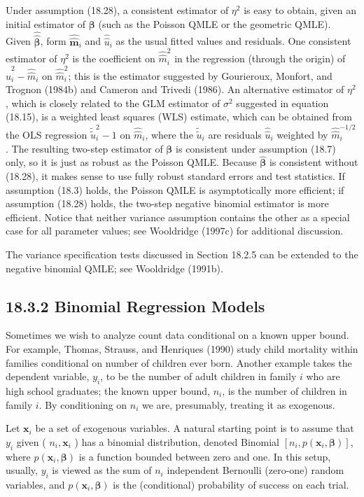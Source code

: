 \documentclass[10pt]{article}
\begin{document}
Under assumption (18.28), a consistent estimator of $\eta^{2}$ is easy to obtain, given an initial estimator of $\boldsymbol{\beta}$ (such as the Poisson QMLE or the geometric QMLE). Given $\hat{\hat{\boldsymbol{\beta}}}$, form $\hat{\hat{\boldsymbol{m}}}_{i}$ and $\hat{\hat{u}}_{i}$ as the usual fitted values and residuals. One consistent estimator of $\eta^{2}$ is the coefficient on $\hat{\hat{m}}_{i}^{2}$ in the regression (through the origin) of $\hat{\hat{u}}_{i}^{2}-\hat{\hat{m}}_{i}$ on $\hat{\hat{m}}_{i}^{2}$; this is the estimator suggested by Gourieroux, Monfort, and Trognon (1984b) and Cameron and Trivedi (1986). An alternative estimator of $\eta^{2}$, which is closely related to the GLM estimator of $\sigma^{2}$ suggested in equation (18.15), is a weighted least squares (WLS) estimate, which can be obtained from the OLS regression $\tilde{\tilde{u}}_{i}^{2}-1$ on $\hat{\hat{m}}_{i}$, where the $\tilde{\tilde{u}}_{i}$ are residuals $\hat{\hat{u}}_{i}$ weighted by $\hat{\hat{m}}_{i}^{-1 / 2}$. The resulting two-step estimator of $\boldsymbol{\beta}$ is consistent under assumption (18.7) only, so it is just as robust as the Poisson QMLE. Because $\hat{\boldsymbol{\beta}}$ is consistent without (18.28), it makes sense to use fully robust standard errors and test statistics. If assumption (18.3) holds, the Poisson QMLE is asymptotically more efficient; if assumption (18.28) holds, the two-step negative binomial estimator is more efficient. Notice that neither variance assumption contains the other as a special case for all parameter values; see Wooldridge (1997c) for additional discussion.

The variance specification tests discussed in Section 18.2.5 can be extended to the negative binomial QMLE; see Wooldridge (1991b).

\subsection*{18.3.2 Binomial Regression Models}
Sometimes we wish to analyze count data conditional on a known upper bound. For example, Thomas, Strauss, and Henriques (1990) study child mortality within families conditional on number of children ever born. Another example takes the dependent variable, $y_{i}$, to be the number of adult children in family $i$ who are high school graduates; the known upper bound, $n_{i}$, is the number of children in family $i$. By conditioning on $n_{i}$ we are, presumably, treating it as exogenous.

Let $\mathbf{x}_{i}$ be a set of exogenous variables. A natural starting point is to assume that $y_{i}$ given ( $n_{i}, \mathbf{x}_{i}$ ) has a binomial distribution, denoted Binomial $\left[n_{i}, p\left(\mathbf{x}_{i}, \boldsymbol{\beta}\right)\right]$, where $p\left(\mathbf{x}_{i}, \boldsymbol{\beta}\right)$ is a function bounded between zero and one. In this setup, usually, $y_{i}$ is viewed as the sum of $n_{i}$ independent Bernoulli (zero-one) random variables, and $p\left(\mathbf{x}_{i}, \boldsymbol{\beta}\right)$ is the (conditional) probability of success on each trial.
\end{document}
